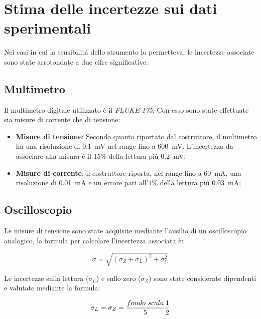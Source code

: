 \documentclass[@SRC@/main]{subfiles}
\begin{document}
    \section{Stima delle incertezze sui dati sperimentali}
    \label{sec:stima-delle-incertezze-sui-dati-sperimentali}
    Nei casi in cui la sensibilità dello strumento lo permetteva, le incertezze associate sono
    state arrotondate a due cifre significative.
    \subsection*{Multimetro}
    Il multimetro digitale utilizzato è il \textit{FLUKE 175}.
    Con esso sono state effettuate sia misure di corrente che di tensione:
    \begin{itemize}
        \item \textbf{Misure di tensione}: Secondo quanto riportato dal costruttore, il multimetro
        ha una risoluzione di 0.1~mV nel range fino a 600~mV. L'incertezza da associare alla misura
        è il $15\%$ della lettura più 0.2~mV;
        \item \textbf{Misure di corrente}: il costruttore riporta, nel range fino a
        60~mA, una risoluzione di 0.01~mA e un errore pari all'$1\%$ della
        lettura più 0.03~mA;
    \end{itemize}

    \subsection*{Oscilloscopio}
    \noindent Le misure di tensione sono state acquisite mediante l'ausilio di un oscilloscopio analogico,
    la formula per calcolare l'incertezza associata è:
    
        \begin{equation*}
            \sigma = \sqrt {\left( \sigma_Z + \sigma_L  \right)^2 + \sigma_C^2}
        \end{equation*}
    
\vspace{0.1cm}
    \noindent Le incertezze sulla lettura ($\sigma_L$) e sullo zero ($\sigma_Z$) sono state considerate dipendenti
    e valutate mediante la formula:
    \vspace{0.1cm}


        \begin{equation*}
            \sigma_L = \sigma_Z = \frac{fondo\textnormal{ }scala}{5} \frac{1}{2}
        \end{equation*}
\end{document}
